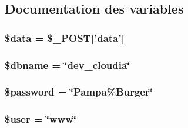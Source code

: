 \subsection{Documentation des variables}
\hypertarget{data_8php_a6efc15b5a2314dd4b5aaa556a375c6d6}{
\subsubsection[{\$data}]{\setlength{\rightskip}{0pt plus 5cm}\$data = \$\-\_\-\-P\-O\-S\-T\mbox{[}'data'\mbox{]}}}\label{data_8php_a6efc15b5a2314dd4b5aaa556a375c6d6}
\hypertarget{data_8php_ac5111a571fffa2499732833bb7f0d8c1}{
\subsubsection[{\$dbname}]{\setlength{\rightskip}{0pt plus 5cm}\$dbname = \char`\"{}dev\-\_\-cloudia\char`\"{}}}\label{data_8php_ac5111a571fffa2499732833bb7f0d8c1}
\hypertarget{data_8php_a607686ef9f99ea7c42f4f3dd3dbb2b0d}{
\subsubsection[{\$password}]{\setlength{\rightskip}{0pt plus 5cm}\$password = \char`\"{}Pampa\%Burger\char`\"{}}}\label{data_8php_a607686ef9f99ea7c42f4f3dd3dbb2b0d}
\hypertarget{data_8php_a598ca4e71b15a1313ec95f0df1027ca5}{
\subsubsection[{\$user}]{\setlength{\rightskip}{0pt plus 5cm}\$user = \char`\"{}www\char`\"{}}}\label{data_8php_a598ca4e71b15a1313ec95f0df1027ca5}
